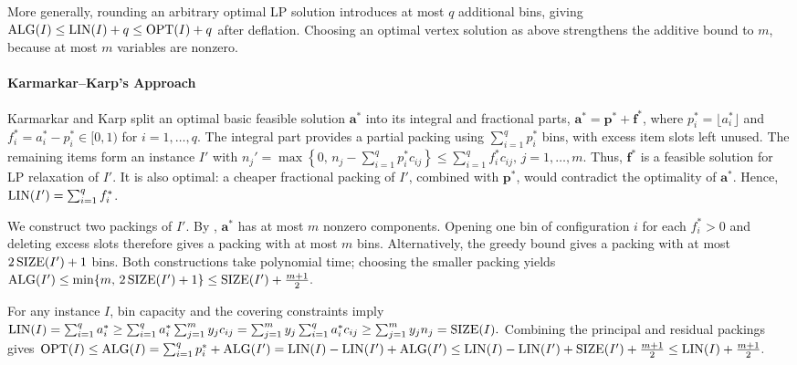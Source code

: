 More generally, rounding an arbitrary optimal LP solution
introduces at most $q$ additional bins, giving
$\operatorname{ALG}(I)\leq\operatorname{LIN}(I)+q\leq\operatorname{OPT}(I)+q$ after deflation.
Choosing an optimal vertex solution as above strengthens
the additive bound to $m$, because at most $m$ variables
are nonzero.

\paragraph{Karmarkar--Karp's Approach}

Karmarkar and Karp split an optimal basic feasible
solution $\mathbf{a}^*$ into its integral and fractional
parts, $\mathbf{a}^*=\mathbf{p}^*+\mathbf{f}^*$, where
$p_i^*=\lfloor a_i^*\rfloor$ and
$f_i^*=a_i^*-p_i^*\in[0,1)$ for $i=1,\ldots,q$.
The integral part provides a partial packing using
$\sum_{i=1}^{q}p_i^*$ bins, with excess item slots left
unused. The remaining items form an instance $I'$ with $
n_j'=\max\left\{0,\,n_j-\sum_{i=1}^{q}p_i^*c_{ij}\right\}
\leq\sum_{i=1}^{q}f_i^*c_{ij},\, j=1,\ldots,m.$
Thus, $\mathbf{f}^*$ is a feasible solution for LP relaxation of 
$I'$. It is also optimal:
a cheaper fractional packing of $I'$, combined with
$\mathbf{p}^*$, would contradict the optimality of
$\mathbf{a}^*$. Hence, $\operatorname{LIN}(I')=\sum_{i=1}^{q}f_i^*$.

We construct two packings of $I'$. By
, $\mathbf{a}^*$ has at
most $m$ nonzero components. Opening one bin of
configuration $i$ for each $f_i^*>0$ and deleting
excess slots therefore gives a packing with at most
$m$ bins. Alternatively, the greedy bound gives a
packing with at most $2\operatorname{SIZE}(I')+1$ bins.
Both constructions take polynomial time; choosing
the smaller packing yields
$\operatorname{ALG}(I')\leq\min\{m,\,2\operatorname{SIZE}(I')+1\} \leq\operatorname{SIZE}(I')+\frac{m+1}{2}.$

For any instance $I$, bin capacity and the covering
constraints imply
$   \operatorname{LIN}(I)=\sum_{i=1}^{q}a_i^*
    \geq\sum_{i=1}^{q}a_i^*\sum_{j=1}^{m}y_jc_{ij}
    =\sum_{j=1}^{m}y_j\sum_{i=1}^{q}a_i^*c_{ij}
    \geq\sum_{j=1}^{m}y_jn_j
    =\operatorname{SIZE}(I).
$
Combining the principal and residual packings gives
$\operatorname{OPT}(I)\leq\operatorname{ALG}(I) = \sum_{i=1}^{q}p_i^*+\operatorname{ALG}(I') =\operatorname{LIN}(I)-\operatorname{LIN}(I')+\operatorname{ALG}(I')
\leq\operatorname{LIN}(I)-\operatorname{LIN}(I')+\operatorname{SIZE}(I')+\frac{m+1}{2}
\leq\operatorname{LIN}(I)+\frac{m+1}{2}.
$
